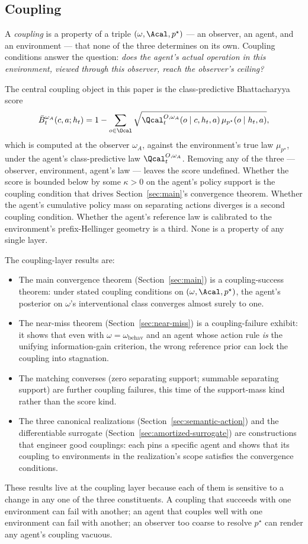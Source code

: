 \subsection{Coupling}
\label{sec:ontology-coupling}

A \emph{coupling} is a property of a triple $(\omega,\Acal,p^\star)$ --- an observer, an agent, and an environment --- that none of the three determines on its own. Coupling conditions answer the question: \emph{does the agent's actual operation in this environment, viewed through this observer, reach the observer's ceiling?}

The central coupling object in this paper is the class-predictive Bhattacharyya score
\[
\bar B_t^{\omega_A}(c,a;h_t)
=
1-\sum_{o\in\Ocal}\sqrt{\Qcal_t^{O,\omega_A}(o\mid c,h_t,a)\,\mu_{p^\star}(o\mid h_t,a)},
\]
which is computed at the observer $\omega_A$, against the environment's true law $\mu_{p^\star}$, under the agent's class-predictive law $\Qcal_t^{O,\omega_A}$. Removing any of the three --- observer, environment, agent's law --- leaves the score undefined. Whether the score is bounded below by some $\kappa>0$ on the agent's policy support is the coupling condition that drives Section~\ref{sec:main}'s convergence theorem. Whether the agent's cumulative policy mass on separating actions diverges is a second coupling condition. Whether the agent's reference law is calibrated to the environment's prefix-Hellinger geometry is a third. None is a property of any single layer.

The coupling-layer results are:
\begin{itemize}
\item The main convergence theorem (Section~\ref{sec:main}) is a coupling-success theorem: under stated coupling conditions on $(\omega,\Acal,p^\star)$, the agent's posterior on $\omega$'s interventional class converges almost surely to one.
\item The near-miss theorem (Section~\ref{sec:near-miss}) is a coupling-failure exhibit: it shows that even with $\omega=\omega_{\mathrm{behav}}$ and an agent whose action rule \emph{is} the unifying information-gain criterion, the wrong reference prior can lock the coupling into stagnation.
\item The matching converses (zero separating support; summable separating support) are further coupling failures, this time of the support-mass kind rather than the score kind.
\item The three canonical realizations (Section~\ref{sec:semantic-action}) and the differentiable surrogate (Section~\ref{sec:amortized-surrogate}) are constructions that engineer good couplings: each pins a specific agent and shows that its coupling to environments in the realization's scope satisfies the convergence conditions.
\end{itemize}
These results live at the coupling layer because each of them is sensitive to a change in any one of the three constituents. A coupling that succeeds with one environment can fail with another; an agent that couples well with one environment can fail with another; an observer too coarse to resolve $p^\star$ can render any agent's coupling vacuous.


